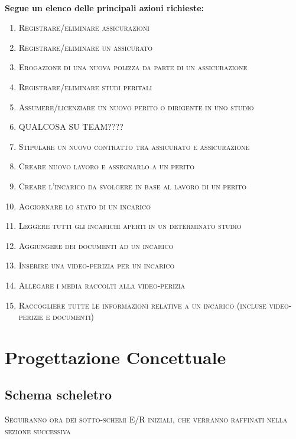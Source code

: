 \documentclass[a4paper,12pt]{report}
\begin{document}
\\
\textbf{Segue un elenco delle principali azioni richieste:}
\begin{enumerate}
    \item \textsc{Registrare/eliminare assicurazioni}
    \item \textsc{Registrare/eliminare un assicurato}
    \item \textsc{Erogazione di una nuova polizza da parte di un assicurazione}
    \item \textsc{Registrare/eliminare studi peritali}
    \item \textsc{Assumere/licenziare un nuovo perito o dirigente in uno studio}
    \item \textsc{QUALCOSA SU TEAM????}
    \item \textsc{Stipulare un nuovo contratto tra assicurato e assicurazione}
    \item \textsc{Creare nuovo lavoro e assegnarlo a un perito}
    \item \textsc{Creare l’incarico da svolgere in base al lavoro di un perito}
    \item \textsc{Aggiornare lo stato di un incarico}
    \item \textsc{Leggere tutti gli incarichi aperti in un determinato studio}
    \item \textsc{Aggiungere dei documenti ad un incarico}
    \item \textsc{Inserire una video-perizia per un incarico}
    \item \textsc{Allegare i media raccolti alla video-perizia}
    \item \textsc{Raccogliere tutte le informazioni relative a un incarico (incluse video-perizie e documenti)}
\end{enumerate}


\chapter{Progettazione Concettuale}

\section{Schema scheletro}

\textsc{Seguiranno ora dei sotto-schemi E/R iniziali, che verranno raffinati nella sezione successiva}
\end{document}
